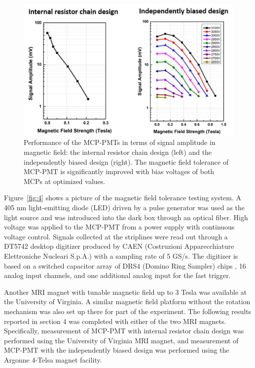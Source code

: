 \documentclass[preprint,5p]{elsarticle}
\begin{document}
\begin{figure}[tbp]
\centering \includegraphics[scale=0.7]{fig/Figure5.jpg}
\caption{Performance of the MCP-PMTs in terms of signal amplitude in magnetic 
   field: the internal resistor chain design (left) and the independently 
   biased design (right). The magnetic field tolerance of MCP-PMT is 
   significantly improved with bias voltages of both MCPs at optimized values.  
   } \label{fig:5}
\end{figure}



Figure~\ref{fig:4} shows a picture of the magnetic field tolerance testing 
system.  A 405 nm light-emitting diode (LED) driven by a pulse generator was 
used as the light source and was introduced into the dark box through an 
optical fiber.  High voltage was applied to the MCP-PMT from a power supply 
with continuous voltage control. Signals collected at the striplines were read 
out through a DT5742 desktop digitizer \cite{19} produced by CAEN (Costruzioni 
Apparecchiature Elettroniche Nucleari S.p.A.) with a sampling rate of 5 GS/s.  
The digitizer is based on a switched capacitor array of DRS4 (Domino Ring 
Sampler) chips \cite{20}, 16 analog input channels, and one additional analog 
input for the fast trigger. 

Another MRI magnet with tunable magnetic field up to 3 Tesla was available at 
the University of Virginia. A similar magnetic field platform without the 
rotation mechanism was also set up there for part of the experiment. The 
following results reported in section 4 was completed with either of the two 
MRI magnets. Specifically, measurement of MCP-PMT with internal resistor chain 
design was performed using the University of Virginia MRI magnet, and 
measurement of MCP-PMT with the independently biased design was performed using 
the Argonne 4-Telsa magnet facility. 
\end{document}
